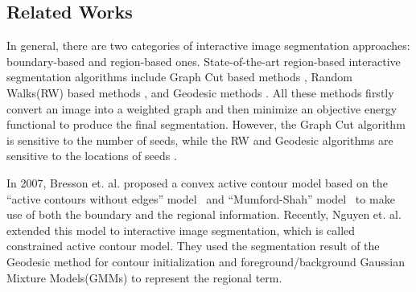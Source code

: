 \documentclass{article}
\begin{document}
\subsection{Related Works}
%
In general, there are two categories of interactive image segmentation approaches: boundary-based and region-based ones. State-of-the-art region-based interactive segmentation algorithms include Graph Cut based methods \cite{boykov2001interactive, rother2004grabcut}, Random Walks(RW) based methods \cite{grady2006random, zhang2010diffusion}, and Geodesic methods \cite{bai2007geodesic, criminisi2008geos}. All these methods firstly convert an image into a weighted graph and then minimize an objective energy functional to produce the final segmentation. However, the Graph Cut algorithm is sensitive to the number of seeds, while the RW and Geodesic algorithms are sensitive to the locations of seeds \cite{sinop2007seeded}.
%

In 2007, Bresson et. al. \cite{bresson2007fast} proposed a convex active contour model based on the ``active contours without edges'' model~\cite{ChanV01} and ``Mumford-Shah'' model~\cite{Mumford89} to make use of both the boundary and the regional information. Recently, Nguyen et. al.\cite{nguyen2012robust} extended this model to interactive image segmentation, which is called constrained active contour model. They used the segmentation result of the Geodesic method \cite{bai2007geodesic} for contour initialization and foreground/background Gaussian Mixture Models(GMMs)\cite{rother2004grabcut} to represent the regional term.
%
\end{document}
